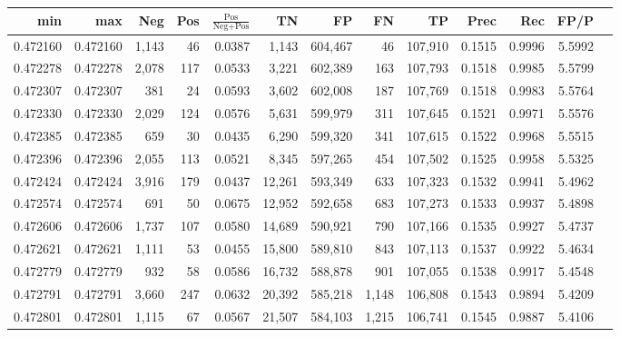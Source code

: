 \begin{tabular}{rrrrrrrrrrrrr}
\toprule
     min &      max &   Neg &   Pos & $\frac{\text{Pos}}{\text{Neg}+\text{Pos}}$ &      TN &      FP &      FN &      TP &   Prec &    Rec &   FP/P \\
\midrule
0.472160 & 0.472160 & 1,143 &    46 &                                     0.0387 &   1,143 & 604,467 &      46 & 107,910 & 0.1515 & 0.9996 & 5.5992 \\
0.472278 & 0.472278 & 2,078 &   117 &                                     0.0533 &   3,221 & 602,389 &     163 & 107,793 & 0.1518 & 0.9985 & 5.5799 \\
0.472307 & 0.472307 &   381 &    24 &                                     0.0593 &   3,602 & 602,008 &     187 & 107,769 & 0.1518 & 0.9983 & 5.5764 \\
0.472330 & 0.472330 & 2,029 &   124 &                                     0.0576 &   5,631 & 599,979 &     311 & 107,645 & 0.1521 & 0.9971 & 5.5576 \\
0.472385 & 0.472385 &   659 &    30 &                                     0.0435 &   6,290 & 599,320 &     341 & 107,615 & 0.1522 & 0.9968 & 5.5515 \\
0.472396 & 0.472396 & 2,055 &   113 &                                     0.0521 &   8,345 & 597,265 &     454 & 107,502 & 0.1525 & 0.9958 & 5.5325 \\
0.472424 & 0.472424 & 3,916 &   179 &                                     0.0437 &  12,261 & 593,349 &     633 & 107,323 & 0.1532 & 0.9941 & 5.4962 \\
0.472574 & 0.472574 &   691 &    50 &                                     0.0675 &  12,952 & 592,658 &     683 & 107,273 & 0.1533 & 0.9937 & 5.4898 \\
0.472606 & 0.472606 & 1,737 &   107 &                                     0.0580 &  14,689 & 590,921 &     790 & 107,166 & 0.1535 & 0.9927 & 5.4737 \\
0.472621 & 0.472621 & 1,111 &    53 &                                     0.0455 &  15,800 & 589,810 &     843 & 107,113 & 0.1537 & 0.9922 & 5.4634 \\
0.472779 & 0.472779 &   932 &    58 &                                     0.0586 &  16,732 & 588,878 &     901 & 107,055 & 0.1538 & 0.9917 & 5.4548 \\
0.472791 & 0.472791 & 3,660 &   247 &                                     0.0632 &  20,392 & 585,218 &   1,148 & 106,808 & 0.1543 & 0.9894 & 5.4209 \\
0.472801 & 0.472801 & 1,115 &    67 &                                     0.0567 &  21,507 & 584,103 &   1,215 & 106,741 & 0.1545 & 0.9887 & 5.4106 \\

\end{tabular}
